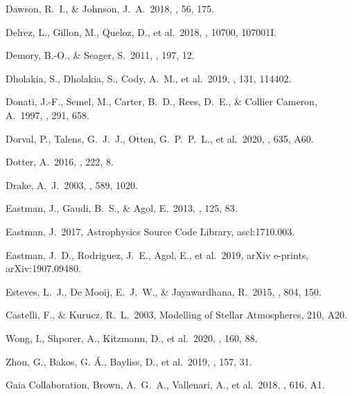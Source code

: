  Dawson, R.~I., \& Johnson, J.~A.\ 2018, \araa, 56, 175.

 Delrez, L., Gillon, M., Queloz, D., et al.\ 2018, \procspie, 10700, 107001I.

 Demory, B.-O., \& Seager, S.\ 2011, \apjs, 197, 12.

 Dholakia, S., Dholakia, S., Cody, A.~M., et al.\ 2019, \pasp, 131, 114402.

 Donati, J.-F., Semel, M., Carter, B.~D., Rees, D.~E., \& Collier Cameron, A.\ 1997, \mnras, 291, 658.

 Dorval, P., Talens, G.~J.~J., Otten, G.~P.~P.~L., et al.\ 2020, \aap, 635, A60.

 Dotter, A.\ 2016, \apjs, 222, 8.

 Drake, A.~J.\ 2003, \apj, 589, 1020.

 Eastman, J., Gaudi, B.~S., \& Agol, E.\ 2013, \pasp, 125, 83.

 Eastman, J.\ 2017, Astrophysics Source Code Library, ascl:1710.003.

 Eastman, J.~D., Rodriguez, J.~E., Agol, E., et al.\ 2019, arXiv e-prints, arXiv:1907.09480.

 Esteves, L.~J., De Mooij, E.~J.~W., \& Jayawardhana, R.\ 2015, \apj, 804, 150.


 Castelli, F., \& Kurucz, R.~L.\ 2003, Modelling of Stellar Atmospheres, 210, A20.



 Wong, I., Shporer, A., Kitzmann, D., et al.\ 2020, \aj, 160, 88.



 Zhou, G., Bakos, G. {\'A}., Bayliss, D., et al.\ 2019, \aj, 157, 31.



 Gaia Collaboration, Brown, A.~G.~A., Vallenari, A., et al.\ 2018, \aap, 616, A1.

